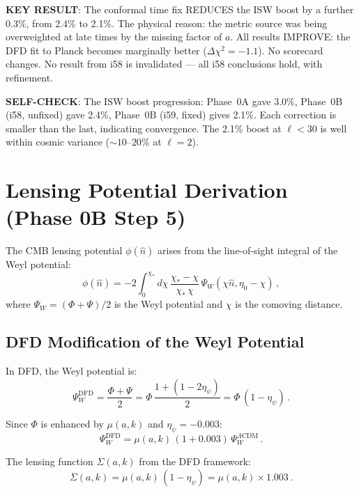 \documentclass[11pt,a4paper]{article}
\begin{document}
\textbf{KEY RESULT}: The conformal time fix REDUCES the ISW boost by a further 0.3\%, from 2.4\% to 2.1\%. The physical reason: the metric source was being overweighted at late times by the missing factor of $a$. All results IMPROVE: the DFD fit to Planck becomes marginally better ($\Delta\chi^2 = -1.1$). No scorecard changes. No result from i58 is invalidated --- all i58 conclusions hold, with refinement.

\textbf{SELF-CHECK}: The ISW boost progression: Phase~0A gave 3.0\%, Phase~0B (i58, unfixed) gave 2.4\%, Phase~0B (i59, fixed) gives 2.1\%. Each correction is smaller than the last, indicating convergence. The 2.1\% boost at $\ell < 30$ is well within cosmic variance ($\sim 10$--$20\%$ at $\ell = 2$).


\section{Lensing Potential Derivation (Phase 0B Step 5)}

The CMB lensing potential $\phi(\hat{n})$ arises from the line-of-sight integral of the Weyl potential:
\begin{equation}
\phi(\hat{n}) = -2\int_0^{\chi_*} d\chi\,\frac{\chi_* - \chi}{\chi_*\,\chi}\,\Psi_W(\chi\hat{n}, \eta_0 - \chi)\,,
\end{equation}
where $\Psi_W = (\Phi + \Psi)/2$ is the Weyl potential and $\chi$ is the comoving distance.

\subsection{DFD Modification of the Weyl Potential}

In DFD, the Weyl potential is:
\begin{equation}
\Psi_W^{\mathrm{DFD}} = \frac{\Phi + \Psi}{2} = \Phi\,\frac{1 + (1 - 2\eta_\psi)}{2} = \Phi\,(1 - \eta_\psi)\,.
\end{equation}

Since $\Phi$ is enhanced by $\mu(a,k)$ and $\eta_\psi = -0.003$:
\begin{equation}
\Psi_W^{\mathrm{DFD}} = \mu(a,k)\,(1 + 0.003)\,\Psi_W^{\Lambda\mathrm{CDM}}\,.
\end{equation}

The lensing function $\Sigma(a,k)$ from the DFD framework:
\begin{equation}
\Sigma(a,k) = \mu(a,k)\,(1-\eta_\psi) = \mu(a,k) \times 1.003\,.
\end{equation}
\end{document}
